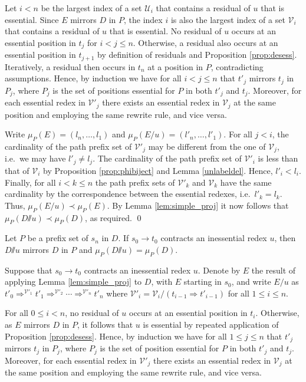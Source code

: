 \documentclass{LMCS}
\theoremstyle{definition}
\newcommand{\rew}{\rightarrow}
\newcommand{\emmy}{\mathord{\sslash}}
\newcommand{\dev}{\Rightarrow}
\newcommand{\pme}{\mu}
\newcommand{\pmep}[2]{\pme_{#1}({#2})}
\newcommand{\fscdp}[3]{{#1}'_0 \dev^{\mathcal{#2}'_1} {#1}'_1 \dev^{\mathcal{#2}'_2} \cdots \dev^{\mathcal{#2}'_{#3}} {#1}'_{#3}}
\begin{document}
Let $i < n$ be the largest index of a set $\mathcal{U}_i$ that contains a residual of $u$ that is essential. Since $E$ mirrors $D$ in $P$, the index $i$ is also the largest index of a set $\mathcal{V}_i$ that contains a residual of $u$ that is essential. No residual of $u$ occurs at an essential position in $t_j$ for $i < j \leq n$. Otherwise, a residual also occurs at an essential position in $t_{j + 1}$ by definition of residuals and Proposition \ref{prop:desess}. Iteratively, a residual then occurs in $t_n$ at a position in $P$, contradicting assumptions. Hence, by induction we have for all $i < j \leq n$ that $t'_j$ mirrors $t_j$ in $P_j$, where $P_j$ is the set of positions essential for $P$ in both $t'_j$ and $t_j$. Moreover, for each essential redex in $\mathcal{V}'_j$ there exists an essential redex in $\mathcal{V}_j$ at the same position and employing the same rewrite rule, and vice versa.

Write $\pmep{P}{E} = (l_n, \ldots, l_1)$ and $\pmep{P}{E/u} = (l'_n,\ldots,l'_1)$. For all $j < i$, the cardinality of the path prefix set of $\mathcal{V}'_j$ may be different from the one of $\mathcal{V}_j$, i.e.\ we may have $l'_j \not = l_j$. The cardinality of the path prefix set of $\mathcal{V}'_i$ is less than that of $\mathcal{V}_i$ by Proposition \ref{prop:phibiject} and Lemma \ref{unlabeldel}. Hence, $l'_i < l_i$. Finally, for all $i < k \leq n$ the path prefix sets of $\mathcal{V}'_k$ and $\mathcal{V}_k$ have the same cardinality by the correspondence between the essential redexes, i.e.\ $l'_k = l_k$. Thus, $\pmep{P}{E/u} \prec \pmep{P}{E}$. By Lemma \ref{lem:simple_proj} it now follows that $\pmep{P}{D \emmy u} \prec \pmep{P}{D}$, as required.
\qed

\begin{lem}
\label{lem:inessential_nonroot_then_equal}
Let $P$ be a prefix set of $s_n$ in $D$. If $s_0 \rew t_0$ contracts an inessential redex $u$, then $D \emmy u$ mirrors $D$ in $P$ and $\pmep{P}{D \emmy u} = \pmep{P}{D}$.
\end{lem}

\proof
Suppose that $s_0 \rew t_0$ contracts an inessential redex $u$. Denote by $E$ the result of applying Lemma \ref{lem:simple_proj} to $D$, with $E$ starting in $s_0$, and write $E/u$ as $\fscdp{t}{V}{n}$ where $\mathcal{V}'_i = \mathcal{V}_i / (t_{i - 1} \dev t'_{i - 1})$ for all $1 \leq i \leq n$.

For all $0 \leq i < n$, no residual of $u$ occurs at an essential position in $t_i$. Otherwise, as $E$ mirrors $D$ in $P$, it follows that $u$ is essential by repeated application of Proposition \ref{prop:desess}. Hence, by induction we have for all $1 \leq j \leq n$ that $t'_j$ mirrors $t_j$ in $P_j$, where $P_j$ is the set of position essential for $P$ in both $t'_j$ and $t_j$. Moreover, for each essential redex in $\mathcal{V}'_j$ there exists an essential redex in $\mathcal{V}_j$ at the same position and employing the same rewrite rule, and vice versa.
\end{document}

